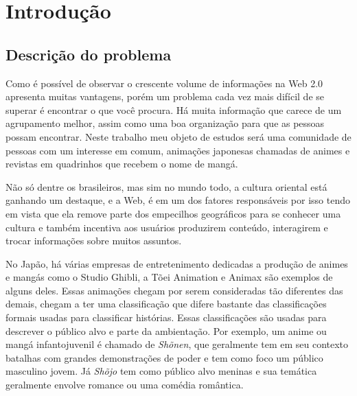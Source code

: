 \documentclass[
	12pt,				%
	openright,			%
	twoside,			%
	a4paper,			%
	Times,
	brazil,				%
	]{abntex2}
\begin{document}
\tableofcontents*
\cleardoublepage


\textual

\chapter{Introdução}
\section{Descrição do problema}
Como é possível de observar o crescente volume de informações na Web 2.0 apresenta muitas vantagens, porém um problema cada vez mais difícil de se superar é encontrar o que você procura. Há muita informação que carece de um agrupamento melhor, assim como uma boa organização para que as pessoas possam encontrar. Neste trabalho meu objeto de estudos será uma comunidade de pessoas com um interesse em comum, animações japonesas chamadas de animes e revistas em quadrinhos que recebem o nome de mangá.
\par

Não só dentre os brasileiros, mas sim no mundo todo, a cultura oriental está ganhando um destaque, e a Web, é em um dos fatores responsáveis por isso tendo em vista que ela remove parte dos empecilhos geográficos para se conhecer uma cultura e também incentiva aos usuários produzirem conteúdo, interagirem e trocar informações sobre muitos assuntos.
\par

No Japão, há várias empresas de entretenimento dedicadas a produção de animes e mangás como o Studio Ghibli, a T\~oei Animation e Animax são exemplos de alguns deles. Essas animações chegam por serem consideradas tão diferentes das demais, chegam a ter uma classificação que difere bastante das classificações formais usadas para classificar histórias. Essas classificações são usadas para descrever o público alvo e parte da ambientação. Por exemplo, um anime ou mangá infantojuvenil é chamado de \textit{Sh\~onen}, que geralmente tem em seu contexto batalhas com grandes demonstrações de poder e tem como foco um público masculino jovem. Já \textit{Sh\~ojo} tem como público alvo meninas e sua temática geralmente envolve romance ou uma comédia romântica.
\par
\end{document}
